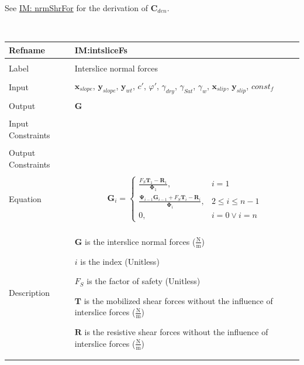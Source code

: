\documentclass[12pt]{article}
\begin{document}
See \hyperref[IM:nrmShrFor]{IM: nrmShrFor} for the derivation of ${\mathbf{C}_{den}}$.
\par~

\noindent \begin{minipage}{\textwidth}
\begin{tabular}{p{} p{}}
\toprule \textbf{Refname} & \textbf{IM:intsliceFs}
\label{IM:intsliceFs}
\\ \midrule \\
Label & Interslice normal forces
\\ \midrule \\
Input & ${\mathbf{x}_{slope}}$, ${\mathbf{y}_{slope}}$, ${\mathbf{y}_{wt}}$, $c'$, $φ'$, ${γ_{dry}}$, ${γ_{Sat}}$, ${γ_{w}}$, ${\mathbf{x}_{slip}}$, ${\mathbf{y}_{slip}}$, $const_f$
\\ \midrule \\
Output & $\mathbf{G}$
\\ \midrule \\
Input Constraints & 
\\ \midrule \\
Output Constraints & 
\\ \midrule \\
Equation & \begin{displaymath}
           {\mathbf{G}}_{i}=\begin{cases}
\frac{{F_{S}} {\mathbf{T}}_{1}-{\mathbf{R}}_{1}}{{\mathbf{Φ}}_{1}}, & i=1\\
\frac{{\mathbf{Ψ}}_{i-1} {\mathbf{G}}_{i-1}+{F_{S}} {\mathbf{T}}_{i}-{\mathbf{R}}_{i}}{{\mathbf{Φ}}_{i}}, & 2\leq{}i\leq{}n-1\\
0, & i=0\lor{}i=n
\end{cases}
           \end{displaymath}
\\ \midrule \\
Description & \begin{symbDescription}
              \item{$\mathbf{G}$ is the interslice normal forces ($\frac{\text{N}}{\text{m}}$)}
              \item{$i$ is the index (Unitless)}
              \item{${F_{S}}$ is the factor of safety (Unitless)}
              \item{$\mathbf{T}$ is the mobilized shear forces without the influence of interslice forces ($\frac{\text{N}}{\text{m}}$)}
              \item{$\mathbf{R}$ is the resistive shear forces without the influence of interslice forces ($\frac{\text{N}}{\text{m}}$)}

\end{symbDescription}
\end{tabular}
\end{minipage}
\end{document}
